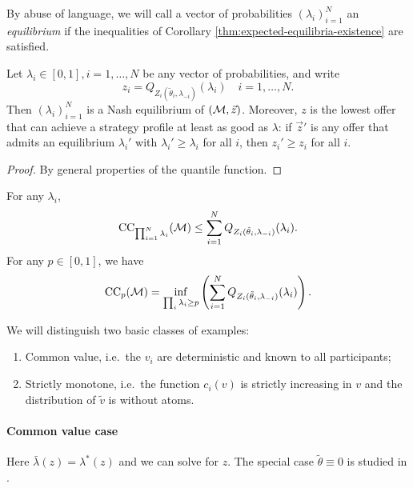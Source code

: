 By abuse of language, we will call a vector of probabilities $(\lambda_i)_{i=1}^N$ an \emph{equilibrium} if the inequalities of Corollary \ref{thm:expected-equilibria-existence} are satisfied.

\begin{corollary}

  Let $\lambda_i\in[0,1], i=1,\ldots,N$ be any vector of probabilities, and write
  \[
    z_i = Q_{Z_i(\tilde\theta_i,\lambda_{-i})}(\lambda_i) \quad i=1,\ldots,N.
  \]
  Then $(\lambda_i)_{i=1}^N$ is a Nash equilibrium of $(\mathcal{M},\vec{z})$.
  Moreover, $z$ is the lowest offer that can achieve a strategy profile at least as good as $\lambda$: if $\vec{z}'$ is any offer that admits an equilibrium $\lambda_i'$ with $\lambda_i'\geq\lambda_i$ for all $i$, then $z_i'\geq z_i$ for all $i$.

\end{corollary}
%
\begin{proof}

  By general properties of the quantile function. \qedhere

\end{proof}

\begin{corollary}

  For any $\lambda_i$,
  \[
    \mathrm{CC}_{\prod_{i=1}^N\lambda_i}(\mathcal{M}) \leq \sum_{i=1}^N Q_{Z_i(\tilde\theta_i,\lambda_{-i})}(\lambda_i) .
  \]
  For any $p\in[0,1]$, we have
  \[
    \mathrm{CC}_{p}(\mathcal{M}) = \inf_{\prod_i\lambda_i \geq p} \left(\sum_{i=1}^N Q_{Z_i(\tilde\theta_i,\lambda_{-i})}(\lambda_i) \right).
  \]
  

\end{corollary}



We will distinguish two basic classes of examples:
\begin{enumerate}
  \item Common value, i.e.~the $v_i$ are deterministic and known to all participants;
  \item Strictly monotone, i.e.~the function $c_i(v)$ is strictly increasing in $v$ and the distribution of $\tilde{v}$ is without atoms.
\end{enumerate}

\paragraph{Common value case}
Here $\bar\lambda(z)=\lambda^*(z)$ and we can solve for $z$.
%
The special case $\tilde\theta \equiv 0$ is studied in \cite{FPR}.


